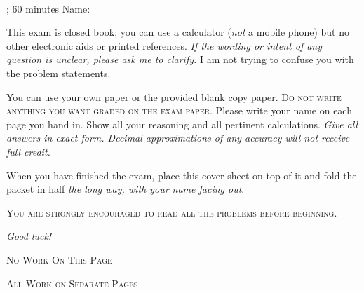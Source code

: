 \documentclass[12pt]{exam}
\begin{document}
\noindent
\textbf{{\large \courseID \\ \assignmentID}}

\noindent
\dateID; 60 minutes  \hfill Name: \underline{\hspace{3in}} 

\addpoints

\noindent
This exam is closed book; you can use a calculator (\emph{not} a mobile phone) but no other electronic aids or printed references. \emph{If the wording or intent of any question is unclear, please ask me to clarify.} I am not trying to confuse you with the problem statements.

You can use your own paper or the provided blank copy paper. \textsc{Do not write anything you want graded on the exam paper.} Please write your name on each page you hand in. Show all your reasoning and all pertinent calculations. \emph{Give all answers in exact form. Decimal approximations of any accuracy will not receive full credit.}

When you have finished the exam, place this cover sheet on top of it and fold the packet in half \emph{the long way, with your name facing out}.


\begin{center}
\textsc{You are strongly encouraged to read all the problems before beginning.}
\end{center}


\begin{figure}[h]
\centering
\end{figure}

\begin{center}
    \gradetable
\end{center}


\begin{center}
    {\Large \emph{Good luck!}}
\end{center}

\newpage

\begin{center}
    {\Large \textsc{No Work On This Page}}

    {\Large \textsc{All Work on Separate Pages}}
\end{center}
\end{document}
